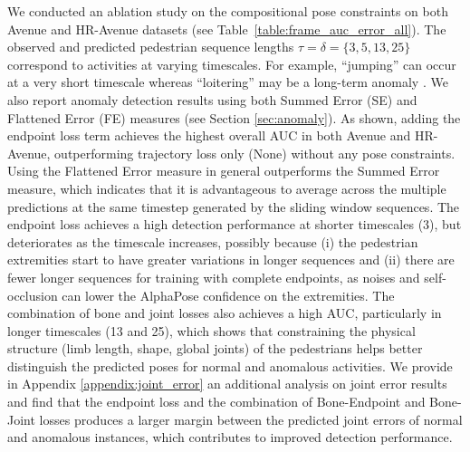 \documentclass[nohyperref]{article}
\theoremstyle{plain}
\theoremstyle{definition}
\theoremstyle{remark}
\begin{document}
We conducted an ablation study on the compositional pose constraints  on both Avenue and HR-Avenue datasets (see Table~\ref{table:frame_auc_error_all}). The observed and predicted pedestrian sequence lengths $\tau=\delta=\{3,5,13,25\}$ correspond to activities  at varying timescales. For example, ``jumping'' can occur at a very short timescale whereas ``loitering'' may be
a long-term anomaly \cite{rodrigues2020multi}. We also report anomaly detection results using both Summed Error (SE) and Flattened Error (FE) measures (see Section \ref{sec:anomaly}). As shown, adding the endpoint loss term achieves the highest overall AUC in both Avenue and HR-Avenue, outperforming trajectory loss only (None) without any pose constraints. Using the Flattened Error measure in general outperforms the Summed Error measure, which indicates that it is advantageous to average across the multiple predictions at the same timestep generated by the sliding window sequences. The endpoint loss achieves a high detection performance at shorter timescales (3), but deteriorates as the timescale increases, possibly because (i) the pedestrian extremities start to have greater variations in longer sequences and (ii) there are fewer longer sequences for training with complete endpoints, as noises and self-occlusion can lower the AlphaPose confidence on the extremities. The combination of bone and joint losses also achieves a high AUC, particularly in longer timescales (13 and 25), which shows that constraining the physical structure (limb length, shape, global joints) of the pedestrians helps better distinguish the predicted poses for normal and anomalous activities. We provide in Appendix \ref{appendix:joint_error}
 an additional analysis on joint error results and find that the endpoint loss and the combination of Bone-Endpoint and Bone-Joint losses produces a larger margin between the predicted joint errors of normal and anomalous instances, which  contributes to improved detection performance. 



\vspace{-4mm}
\end{document}
